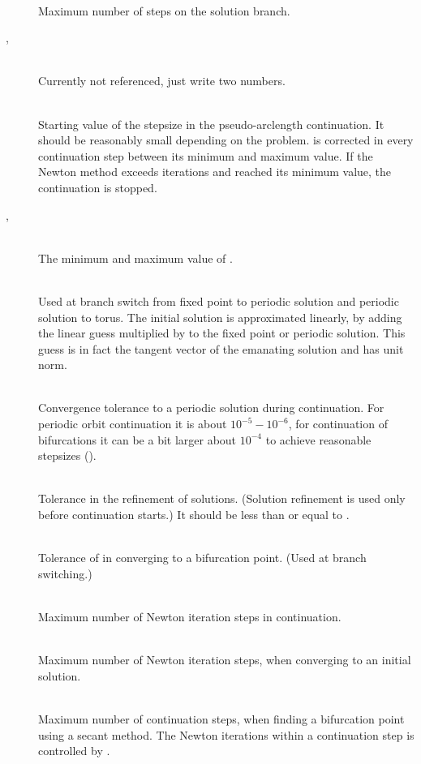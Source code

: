 \documentclass[10pt,a4paper]{ddedoc}
\begin{document}
\begin{description}
%
\item[] ~\\
Maximum number of steps on the solution branch.
%
\item[, ] ~\\
Currently not referenced, just write two numbers.
%
\item[] ~\\
Starting value of the stepsize in the pseudo-arclength continuation.
It should be reasonably small depending on the problem.  is corrected in every continuation step between its minimum and maximum value. If the Newton method exceeds  iterations and  reached its minimum value, the continuation is stopped.
%
\item[, ] ~\\
The minimum and maximum value of .
%
\item[] ~\\
Used at branch switch from fixed point to periodic solution and periodic solution to torus. The initial solution is approximated linearly, by adding the linear guess multiplied by  to the fixed point or periodic solution. This guess is in fact the tangent vector of the emanating solution and has unit norm.
%
\item[] ~\\
Convergence tolerance to a periodic solution during continuation. For periodic orbit continuation it is about $10^{-5} - 10^{-6}$, for continuation of bifurcations it can be a bit larger about $10^{-4}$ to achieve reasonable stepsizes ().
%
\item[] ~\\
Tolerance in the refinement of solutions. (Solution refinement is used only before continuation starts.) It should be less than or equal to .
%
\item[] ~\\
Tolerance of  in converging to a bifurcation point. (Used at branch switching.)
%
\item[] ~\\
Maximum number of Newton iteration steps in continuation.
%
\item[] ~\\
Maximum number of Newton iteration steps, when converging to an initial solution.
%
\item[] ~\\
Maximum number of continuation steps, when finding a bifurcation point using a secant method.
The Newton iterations within a continuation step is controlled by .
%
\end{description}
\end{document}
